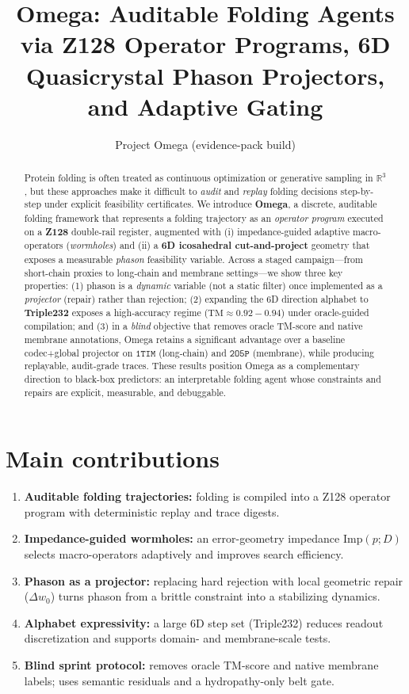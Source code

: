 \documentclass[10pt]{article}
\title{\textbf{Omega}: Auditable Folding Agents via Z128 Operator Programs, 6D Quasicrystal Phason Projectors, and Adaptive Gating}
\author{Project Omega (evidence-pack build)}
\date{}
\begin{document}
\maketitle

\begin{abstract}
Protein folding is often treated as continuous optimization or generative sampling in \(\mathbb{R}^3\), but these approaches make it difficult to \emph{audit} and \emph{replay} folding decisions step-by-step under explicit feasibility certificates.
We introduce \textbf{Omega}, a discrete, auditable folding framework that represents a folding trajectory as an \emph{operator program} executed on a \textbf{Z128} double-rail register, augmented with (i) impedance-guided adaptive macro-operators (\emph{wormholes}) and (ii) a \textbf{6D icosahedral cut-and-project} geometry that exposes a measurable \emph{phason} feasibility variable.
Across a staged campaign—from short-chain proxies to long-chain and membrane settings—we show three key properties:
(1) phason is a \emph{dynamic} variable (not a static filter) once implemented as a \emph{projector} (repair) rather than rejection;
(2) expanding the 6D direction alphabet to \textbf{Triple232} exposes a high-accuracy regime (\(\mathrm{TM}\approx 0.92\!-\!0.94\)) under oracle-guided compilation; and
(3) in a \emph{blind} objective that removes oracle TM-score and native membrane annotations, Omega retains a significant advantage over a baseline codec+global projector on \(\texttt{1TIM}\) (long-chain) and \(\texttt{2O5P}\) (membrane), while producing replayable, audit-grade traces.
These results position Omega as a complementary direction to black-box predictors: an interpretable folding agent whose constraints and repairs are explicit, measurable, and debuggable.
\end{abstract}

\section*{Main contributions}
\begin{enumerate}[leftmargin=*]
  \item \textbf{Auditable folding trajectories:} folding is compiled into a Z128 operator program with deterministic replay and trace digests.
  \item \textbf{Impedance-guided wormholes:} an error-geometry impedance \(\mathrm{Imp}(p;D)\) selects macro-operators adaptively and improves search efficiency.
  \item \textbf{Phason as a projector:} replacing hard rejection with local geometric repair (\(\Delta w_0\)) turns phason from a brittle constraint into a stabilizing dynamics.
  \item \textbf{Alphabet expressivity:} a large 6D step set (Triple232) reduces readout discretization and supports domain- and membrane-scale tests.
  \item \textbf{Blind sprint protocol:} removes oracle TM-score and native membrane labels; uses semantic residuals and a hydropathy-only belt gate.
\end{enumerate}
\end{document}

